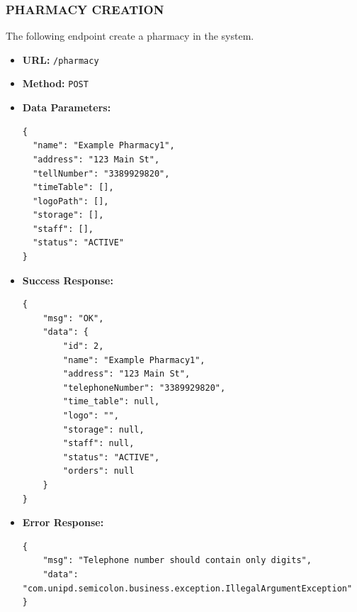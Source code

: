 \subsubsection*{PHARMACY CREATION}
The following endpoint create a pharmacy in the system.
\begin{itemize}
    \item \textbf{URL:}
    \newline \hspace*{1cm} \texttt{/pharmacy}  
    \item \textbf{Method:}
    \newline \hspace*{1cm}\texttt{POST}
    \item \textbf{Data Parameters:}
\begin{lstlisting}[breaklines]
{
  "name": "Example Pharmacy1",
  "address": "123 Main St",
  "tellNumber": "3389929820",
  "timeTable": [],
  "logoPath": [],
  "storage": [],
  "staff": [],
  "status": "ACTIVE"
}

\end{lstlisting}
\item \textbf{Success Response:}
\begin{lstlisting}[breaklines]
{
    "msg": "OK",
    "data": {
        "id": 2,
        "name": "Example Pharmacy1",
        "address": "123 Main St",
        "telephoneNumber": "3389929820",
        "time_table": null,
        "logo": "",
        "storage": null,
        "staff": null,
        "status": "ACTIVE",
        "orders": null
    }
}
\end{lstlisting}
    \item \textbf{Error Response:}
\begin{lstlisting}[breaklines]
{
    "msg": "Telephone number should contain only digits",
    "data": "com.unipd.semicolon.business.exception.IllegalArgumentException"
}
\end{lstlisting}
\end{itemize}
